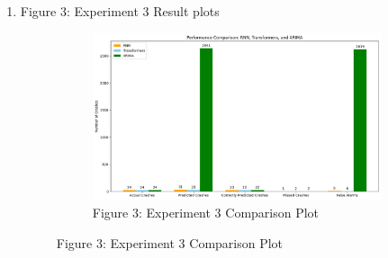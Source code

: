 \documentclass[12pt, letterpaper]{article}
\begin{document}
\begin{enumerate}
    \item Figure 3: Experiment 3 Result plots 
    \begin{figure}[H]
        \centering
        \begin{subfigure}[b]{0.9\textwidth}
            \centering
            \includegraphics[width=\textwidth]{exp3_figure.png}
            \caption{Figure 3: Experiment 3 Comparison Plot}
        \end{subfigure}
        \hfill
    \end{figure}
\end{enumerate}

\printbibliography
\end{document}

